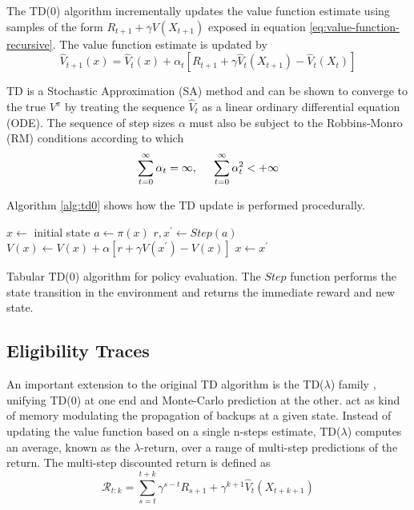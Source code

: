 The TD(0) algorithm incrementally updates the value function estimate using samples
of the form $R_{t+1} + \gamma V(X_{t+1})$ exposed in equation \ref{eq:value-function-recursive}. The value function estimate is updated by
\begin{equation}
\hat{V}_{t+1}(x) = \hat{V}_{t}(x) + \alpha_t \left[ R_{t+1} + \gamma \hat{V}_t (X_{t+1})
- \hat{V}_t(X_t)\right] \label{eq:tdupdate}
\end{equation}

TD is a Stochastic Approximation (SA) method and can be shown to converge \parencite{Csaba2010} to the true $V^\pi$ by treating the sequence $\hat{V}_t$ as a linear ordinary differential equation (ODE). The sequence of step sizes $\alpha$ must also be subject to the Robbins-Monro (RM) conditions according to which
\begin{equation}
\sum_{t=0}^\infty \alpha_t = \infty, \hspace{5mm} 
\sum_{t=0}^\infty \alpha_t^2 < + \infty
\end{equation}

Algorithm \ref{alg:td0} shows how the TD update is performed procedurally.

\begin{algorithm}
\DontPrintSemicolon
{}
$x \leftarrow$ initial state\;
 {
$a \leftarrow \pi(x)$\;
$r, x^\prime \leftarrow Step(a)$\;
$V(x) \leftarrow V(x) + \alpha\left[ r + \gamma V(x^\prime) - V(x) \right]$ \;
$x \leftarrow x^\prime$
}
\caption{Tabular TD(0) algorithm for policy evaluation. The $Step$ function performs
the state transition in the environment and returns the immediate reward and new state.}
\label{alg:td0}
\end{algorithm}

\subsection{Eligibility Traces}

An important extension to the original TD algorithm is the TD($\lambda$) family
\parencite{Sutton1984}, unifying TD(0) at one end and Monte-Carlo prediction at the other.
 act as kind of memory modulating the propagation of backups at a given state. Instead of updating the value function based on 
a single n-steps estimate, TD($\lambda$) computes an average, known as the
$\lambda$-return, over a range of multi-step predictions of the return. The multi-step discounted return is  defined as
\begin{equation}
\mathcal{R}_{t:k} = \sum_{s=t}^{t+k} \gamma^{s-t}R_{s+1} +
\gamma^{k+1}\hat{V}_t(X_{t+k+1})
\end{equation}

